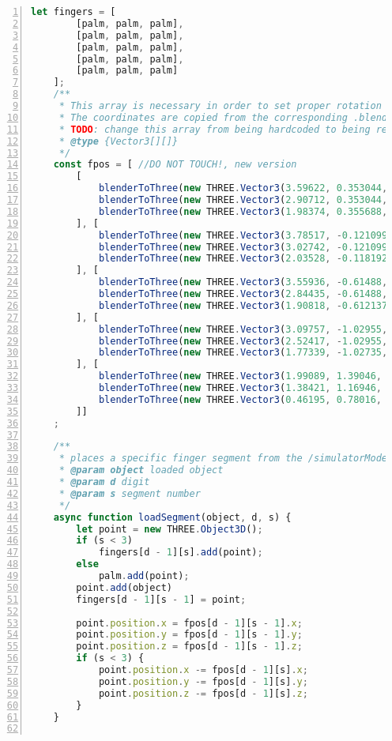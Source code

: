 \documentclass[paper=a4,12pt]{scrreprt}
\begin{document}
\begin{lstlisting}[caption={Emulator-Sourcecode}, captionpos=b, label={listing:emu_source},language=javascript, numbers=left,
  stepnumber=1]
    let fingers = [
        [palm, palm, palm],
        [palm, palm, palm],
        [palm, palm, palm],
        [palm, palm, palm],
        [palm, palm, palm]
    ];
    /**
     * This array is necessary in order to set proper rotation points for the imported models.
     * The coordinates are copied from the corresponding .blend file.
     * TODO: change this array from being hardcoded to being read from a .json file to enable the use of multiple models without code changes.
     * @type {Vector3[][]}
     */
    const fpos = [ //DO NOT TOUCH!, new version
        [
            blenderToThree(new THREE.Vector3(3.59622, 0.353044, -0.018004)),
            blenderToThree(new THREE.Vector3(2.90712, 0.353044, -0.000326)),
            blenderToThree(new THREE.Vector3(1.98374, 0.355688, -0.005718))
        ], [
            blenderToThree(new THREE.Vector3(3.78517, -0.121099, -0.018709)),
            blenderToThree(new THREE.Vector3(3.02742, -0.121099, 0.000276)),
            blenderToThree(new THREE.Vector3(2.03528, -0.118192, -0.005514))
        ], [
            blenderToThree(new THREE.Vector3(3.55936, -0.61488, -0.018362)),
            blenderToThree(new THREE.Vector3(2.84435, -0.61488, -0.00002)),
            blenderToThree(new THREE.Vector3(1.90818, -0.612137, -0.005614))
        ], [
            blenderToThree(new THREE.Vector3(3.09757, -1.02955, -0.016404)),
            blenderToThree(new THREE.Vector3(2.52417, -1.02955, -0.001695)),
            blenderToThree(new THREE.Vector3(1.77339, -1.02735, -0.006181))
        ], [
            blenderToThree(new THREE.Vector3(1.99089, 1.39046, -0.004993)),
            blenderToThree(new THREE.Vector3(1.38421, 1.16946, -0.004993)),
            blenderToThree(new THREE.Vector3(0.46195, 0.78016, -0.004993))
        ]]
    ;

    /**
     * places a specific finger segment from the /simulatorModels folder
     * @param object loaded object
     * @param d digit
     * @param s segment number
     */
    async function loadSegment(object, d, s) {
        let point = new THREE.Object3D();
        if (s < 3)
            fingers[d - 1][s].add(point);
        else
            palm.add(point);
        point.add(object)
        fingers[d - 1][s - 1] = point;

        point.position.x = fpos[d - 1][s - 1].x;
        point.position.y = fpos[d - 1][s - 1].y;
        point.position.z = fpos[d - 1][s - 1].z;
        if (s < 3) {
            point.position.x -= fpos[d - 1][s].x;
            point.position.y -= fpos[d - 1][s].y;
            point.position.z -= fpos[d - 1][s].z;
        }
    }


\end{lstlisting}
\end{document}
